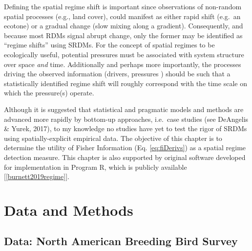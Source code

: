 \documentclass[12pt,twoside,openany]{reedthesis}
\begin{document}
Defining the spatial regime shift is important since observations of
non-random spatial processes (e.g., land cover), could manifest as
either rapid shift (e.g.~an ecotone) or a gradual change (slow mixing
along a gradient). Consequently, and because most RDMs signal abrupt
change, only the former may be identified as ``regime shifts'' using
SRDMs. For the concept of spatial regimes to be ecologically useful,
potential pressures must be associated with system structure over space
\emph{and} time. Additionally and perhaps more importantly, the
processes driving the observed information (drivers, pressures ) should
be such that a statistically identified regime shift will roughly
correspond with the time scale on which the pressure(s) operate.

Although it is suggested that statistical and pragmatic models and
methods are advanced more rapidly by bottom-up approaches, i.e.~case
studies (see DeAngelis \& Yurek, 2017), to my knowledge no studies have
yet to test the rigor of SRDMs using spatially-explicit empirical data.
The objective of this chapter is to determine the utility of Fisher
Information (Eq. \eqref{eq:fiDerivs}) as a spatial regime detection
measure. This chapter is also supported by original software developed
for implementation in Program R, which is publicly available
{[}\ref{burnett2019regime}{]}.

\section{Data and Methods}\label{data-and-methods}

\subsection{Data: North American Breeding Bird
Survey}\label{data-north-american-breeding-bird-survey}
\end{document}
